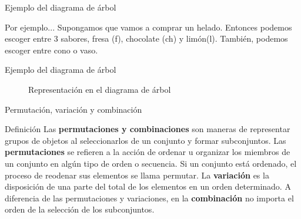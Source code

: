 \documentclass{beamer}
\begin{document}
\begin{frame}{Ejemplo del diagrama de árbol}

  \begin{exampleblock}{Por ejemplo...}
    {Supongamos que vamos a comprar un helado. Entonces podemos escoger entre 3
    sabores, fresa (f), chocolate (ch) y limón(l). También, podemos escoger entre
    cono o vaso.}
  \end{exampleblock}

\end{frame}

\begin{frame}{Ejemplo del diagrama de árbol}
  \begin{figure}[h]
    \begin{center}		
      \end{center}
      \caption{Representación en el diagrama de árbol}
      \label{permutaciones_tree}
  \end{figure}
\end{frame}

\begin{frame}{Permutación, variación y combinación}

  \begin{block}{Definición}
    Las \textbf{permutaciones y combinaciones} son maneras de representar grupos de objetos
    al seleccionarlos de un conjunto y formar subconjuntos.
    \vfill
     Las \textbf{permutaciones} se refieren a la acción de ordenar u organizar los miembros de
    un conjunto en algún tipo de orden o secuencia. Si un conjunto está ordenado, el
    proceso de reodenar sus elementos se llama permutar.
    \vfill
     La \textbf{variación} es la disposición de una parte del total de los elementos en un
    orden determinado.
    \vfill
     A diferencia de las permutaciones y variaciones, en la \textbf{combinación} no importa el orden de la
    selección de los subconjuntos.

  \end{block}

\end{frame}
\end{document}

